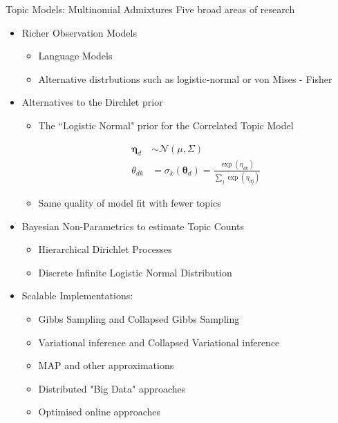 \documentclass[xcolor=dvipsnames]{beamer}
\newcommand \vv[1] { \boldsymbol #1 }
\newcommand \thd[0]  { { \vv \theta_d } }
\newcommand \nor[2]   { \mathcal{N} \left( {#1}, {#2} \right) }
\begin{document}
\begin{frame}{Topic Models: Multinomial Admixtures}
Five broad areas of research
\begin{itemize}
    \item<1-> Richer Observation Models
         { \begin{itemize}
        \item Language Models\cite{Wallach2006}\cite{Wang2007}\cite{Lindsey2012} 
        \item Alternative distrbutions such as logistic-normal\cite{Blei2006a}\cite{Eisenstein2010} or von Mises - Fisher\cite{Reisinger2010}
    \end{itemize} }
    
    \item<2-> Alternatives to the Dirchlet prior
     { 
        \begin{itemize}
            \item The ``Logistic Normal" prior for the Correlated Topic Model\cite{Blei2006}

            \begin{align*}
            \vv{\eta}_d & \sim \nor{\mu}{\Sigma} \\
            \theta_{dk} & = \sigma_k(\thd) = \frac{\exp(\eta_{dk})}{\sum_j \exp(\eta_{dj})}
            \end{align*} 
                
            \item Same quality of model fit with fewer topics
        \end{itemize}
    }

    \item<3-> Bayesian Non-Parametrics to estimate Topic Counts
     { \begin{itemize}
         \item Hierarchical Dirichlet Processes\cite{Teh2006b}
         \item Discrete Infinite Logistic Normal Distribution\cite{Paisley2012}
    \end{itemize} }

    \item<4-> Scalable Implementations: 
     { \begin{itemize}
        \item Gibbs Sampling\cite{Pritchard2000} and Collapsed Gibbs Sampling\cite{Griffiths2004} 
        \item Variational\cite{BleiNgJordan2003} inference and Collapsed Variational\cite{Teh2007}\cite{Hensman2012} inference
        \item MAP and other approximations\cite{Asuncion2012}
        \item Distributed "Big Data" approaches\cite{Smola2010}\cite{Newman2009}\cite{Chen2013}
        \item Optimised online approaches\cite{Hoffman2010}\cite{Hoffman2012}\cite{Mimno2012a}
    \end{itemize} }
    

\end{itemize}
\end{frame}
\end{document}
